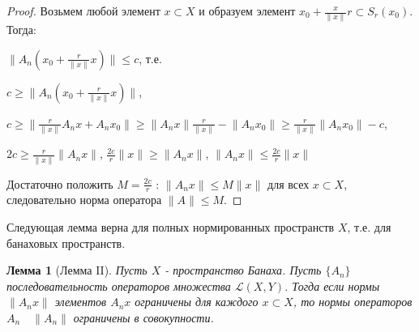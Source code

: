 \documentclass[12pt,a4paper,titlepage]{book}
\theoremstyle{definition}
\theoremstyle{plain}
\theoremstyle{remark}
\theoremstyle{remark}
\theoremstyle{remark}
\theoremstyle{plain}
\newtheorem*{lemma}{Лемма}
\begin{document}
\begin{proof}
Возьмем любой элемент $x \subset X$ и образуем элемент $x_0+\frac{x}{\lVert x\rVert}r \subset S_r(x_0)$. Тогда:

\begin{center}
$\lVert A_n(x_0+\frac{r}{\lVert x\rVert}x)\rVert \le c$, т.е.

$c \ge \lVert A_n(x_0+\frac{r}{\lVert x\rVert}x)\rVert$,

$c \ge \lVert \frac{r}{\lVert x\rVert}A_n x + A_n x_0 \rVert \ge \lVert A_n x\rVert \frac{r}{\lVert x\rVert} - \lVert A_n x_0\rVert \ge \frac{r}{\lVert x\rVert}\lVert A_n x_0\rVert - c$,

$2c \ge \frac{r}{\lVert x\rVert}\lVert A_n x\rVert$, $\frac{2c}{r}\lVert x\rVert \ge \lVert A_n x\rVert$, $\lVert A_n x\rVert \le \frac{2c}{r}\lVert x\rVert$
\end{center}

Достаточно положить $M=\frac{2c}{r}$ : $\lVert A_n x\rVert \le M\lVert x\rVert$ для всех $x \subset X$, следовательно норма оператора $\lVert A\rVert \le M$.
\end{proof}

Следующая лемма верна для полных нормированных пространств $X$, т.е. для банаховых пространств.

\begin{lemma}[Лемма II]
Пусть $X$ - пространство Банаха. Пусть $\lbrace A_n\rbrace$ последовательность операторов множества $\mathcal{L}(X,Y)$. Тогда если нормы $\lVert A_n x\rVert$ элементов $A_n x$ ограничены для каждого $x \subset X$, то нормы операторов $A_n \quad \lVert A_n\rVert$ ограничены в совокупности.
\end{lemma}
\end{document}
